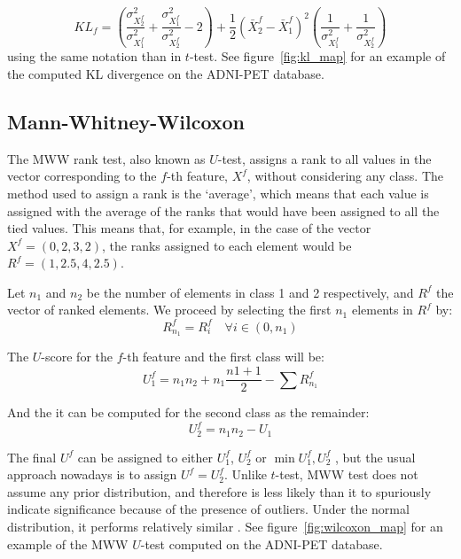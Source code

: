 \begin{equation}\label{eq:kullback}
KL_f = \left(\frac{\sigma_{X_2^f}^2}{\sigma_{X_1^f}^2} +\frac{\sigma_{X_1^f}^2}{\sigma_{X_2^f}^2} -2 \right) + \frac{1}{2}\left(\bar{X}_2^f-\bar{X}_1^f\right)^2\left(\frac{1}{\sigma_{X_1^f}^2} + \frac{1}{\sigma_{X_2^f}^2}\right)
\end{equation}
using the same notation than in $t$-test. See figure~\ref{fig:kl_map} for an example of the computed \ac{KL} divergence on the ADNI-PET database.

\subsection{Mann-Whitney-Wilcoxon} 
The \acf{MWW} rank test, also known as $U$-test, assigns a rank to all values in the vector corresponding to the $f$-th feature, $X^f$, without considering any class. The method used to assign a rank is the `average', which means that each value is assigned with the average of the ranks that would have been assigned to all the tied values. This means that, for example, in the case of the vector $X^f=(0,2,3,2)$, the ranks assigned to each element would be $R^f=(1,2.5,4,2.5)$. 

Let $n_1$ and $n_2$ be the number of elements in class 1 and 2 respectively, and $R^f$ the vector of ranked elements. We proceed by selecting the first $n_1$ elements in $R^f$ by: 
\begin{equation}
R^f_{n_1} = {R^f_i} \quad \forall i\in(0,n_1)
\end{equation}

The $U$-score for the $f$-th feature and the first class will be: 
\begin{equation}
U_1^f = n_1 n_2 + n_1 \frac{n1+1}{2} - \sum R^f_{n_1}
\end{equation}

And the it can be computed for the second class as the remainder: 
\begin{equation}
U_2^f = n_1 n_2 - U_1
\end{equation}

The final $U^f$ can be assigned to either $U_1^f$, $U_2^f$ or $\min{U_1^f,U_2^f}$ \cite{Fay10}, but the usual approach nowadays is to assign $U^f=U_2^f$. Unlike $t$-test, \ac{MWW} test does not assume any prior distribution, and therefore is less likely than it to spuriously indicate significance because of the presence of outliers. Under the normal distribution, it performs relatively similar \cite{Fay10}. See figure~\ref{fig:wilcoxon_map} for an example of the \ac{MWW} $U$-test computed on the ADNI-PET database.

